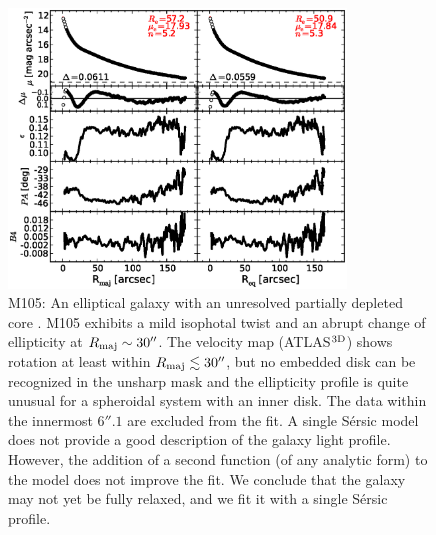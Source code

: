 \documentclass[preprint2]{emulateapj}
\newcommand{\fitfigurewidth}{0.8\textwidth}
\begin{document}
  \begin{figure}[h]
  \begin{center}
  \includegraphics[width=\fitfigurewidth]{images/m105_1Dfit.eps}
  \caption{M105: 
  An elliptical galaxy with an unresolved partially depleted core \citep{rusli2013}. %
  M105 exhibits a mild isophotal twist and an abrupt change of ellipticity at $R_{\rm maj} \sim 30''$.
  The velocity map (ATLAS$^{\rm 3D}$) shows rotation at least within $R_{\rm maj} \lesssim 30''$, 
  but no embedded disk can be recognized in the unsharp mask 
  and the ellipticity profile is quite unusual for a spheroidal system with an inner disk.
  The data within the innermost $6''.1$ are excluded from the fit.
  A single S\'ersic model does not provide a good description of the galaxy light profile.
  However, the addition of a second function (of any analytic form) to the model does not improve the fit.
  We conclude that the galaxy may not yet be fully relaxed, and we fit it with a single S\'ersic profile. 
  }
  \end{center}
  \end{figure}
\end{document}

